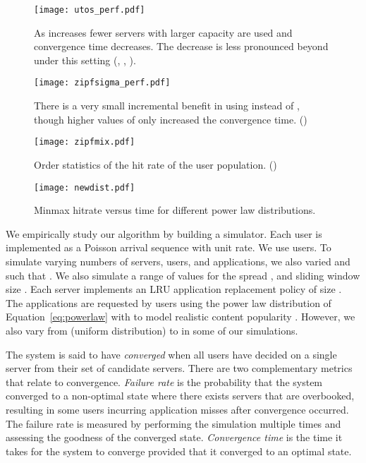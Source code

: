 \documentclass[conference]{IEEEtran}
\begin{document}
\begin{figure*}[t]
  \centering
\begin{minipage}[b]{0.45\textwidth}
\centering
\texttt{[image: utos\_perf.pdf]}
\caption{As  increases  fewer servers with larger capacity are used and convergence time decreases. The decrease is less pronounced beyond   under this setting (, , ).}
\label{fig:utos}
\end{minipage}
\qquad
\begin{minipage}[b]{0.45\textwidth}
\centering
\texttt{[image: zipfsigma\_perf.pdf]}
\caption{There is a very small incremental benefit in using  instead of  , though higher values of  only increased the convergence time. ()}
\label{fig:sigma}
\end{minipage}
\end{figure*}


\begin{figure*}[t]
  \centering
\begin{minipage}[b]{0.45\textwidth}
\centering
\texttt{[image: zipfmix.pdf]}
\caption{Order statistics of the hit rate of the user population. ()}
\label{fig:mix}
\end{minipage}
\qquad
\begin{minipage}[b]{0.45\textwidth}
\centering
\texttt{[image: newdist.pdf]}
\caption{Minmax hitrate versus time for different power law distributions.}
\label{fig:dist}
\end{minipage}
\end{figure*}

We empirically study our algorithm  by building a simulator. Each user is implemented as a Poisson arrival sequence with unit rate.  We use  users. To simulate varying numbers of servers, users, and applications, we also varied   and   such that . We also simulate a range of values for the spread , and sliding window size . Each server implements an LRU application replacement policy of size . The applications are requested by users using the power law distribution of Equation~\ref{eq:powerlaw} with  to model realistic content popularity \cite{Breslau:1999} \cite{Gill:2007}. However, we also vary  from  (uniform distribution) to  in some of our simulations. 


The system is said to have {\em converged\/} when all users have decided on a single server from their set of candidate servers. There are two complementary metrics that relate to convergence.  {\em Failure rate} is the probability that the system converged to a non-optimal state where there exists servers that are overbooked, resulting in some users  incurring application misses after convergence occurred. The failure rate is measured by performing the simulation multiple times and assessing the goodness of the converged state. {\em Convergence time} is the time it takes for the system to converge provided that it converged to an optimal state.
\end{document}
